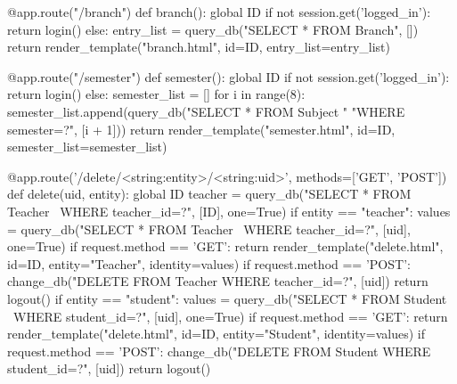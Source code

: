 \begin{python}
@app.route("/branch")
def branch():
    global ID
    if not session.get('logged_in'):
        return login()
    else:
        entry_list = query_db("SELECT * FROM Branch", [])
        return render_template("branch.html", id=ID,
                               entry_list=entry_list)

@app.route("/semester")
def semester():
    global ID
    if not session.get('logged_in'):
        return login()
    else:
        semester_list = []
        for i in range(8):
            semester_list.append(query_db("SELECT * FROM Subject  "
                                          "WHERE semester=?", [i + 1]))
        return render_template("semester.html", id=ID,
                               semester_list=semester_list)

@app.route('/delete/<string:entity>/<string:uid>', methods=['GET', 'POST'])
def delete(uid, entity):
    global ID
    teacher = query_db("SELECT * FROM Teacher \
                         WHERE teacher_id=?", [ID], one=True)
    if entity == "teacher":
        values = query_db("SELECT * FROM Teacher \
                            WHERE teacher_id=?", [uid], one=True)
        if request.method == 'GET':
            return render_template("delete.html", id=ID,
                                   entity="Teacher", identity=values)
        if request.method == 'POST':
            change_db("DELETE FROM Teacher WHERE teacher_id=?",
                      [uid])
            return logout()
    if entity == "student":
        values = query_db("SELECT * FROM Student \
                            WHERE student_id=?", [uid], one=True)
        if request.method == 'GET':
            return render_template("delete.html", id=ID,
                                   entity="Student",  identity=values)
        if request.method == 'POST':
            change_db("DELETE FROM Student WHERE student_id=?", [uid])
            return logout()


\end{python}
